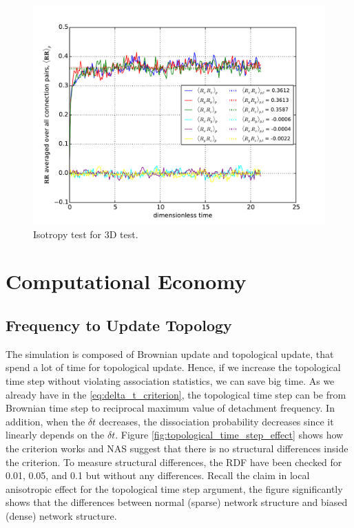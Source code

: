 \documentclass[10pt, a4paper]{article}
\begin{document}
\begin{figure}
  \centering
  \includegraphics[width=\textwidth]{figures/NP1350_LD15P3_C100_averaged_RR.pdf}
  \caption{Isotropy test for 3D test.}
  \label{fig:isotropy}
\end{figure}


\section{Computational Economy}
\subsection{Frequency to Update Topology}
The simulation is composed of Brownian update and topological update, that spend a lot of time for topological update. Hence, if we increase the topological time step without violating association statistics, we can save big time. As we already have in the \eqref{eq:delta_t_criterion}, the topological time step can be from Brownian time step to reciprocal maximum value of detachment frequency. In addition, when the $\delta t$ decreases, the dissociation probability decreases since it linearly depends on the $\delta t$. Figure \ref{fig:topological_time_step_effect} shows how the criterion works and NAS suggest that there is no structural differences inside the criterion. To measure structural differences, the RDF have been checked for 0.01, 0.05, and 0.1 but without any differences. Recall the claim in local anisotropic effect for the topological time step argument, the figure significantly shows that the differences between normal (sparse) network structure and biased (dense) network structure. 
\end{document}
